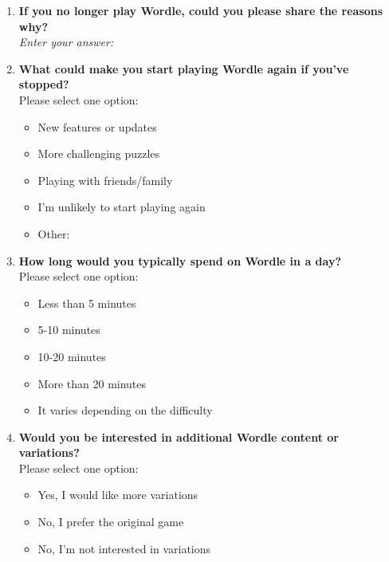 \begin{enumerate}
    \item \textbf{If you no longer play Wordle, could you please share the reasons why?} \\
    \textit{Enter your answer:} \underline{\hspace{10cm}}

    \item \textbf{What could make you start playing Wordle again if you've stopped?} \\
    Please select one option:
    \begin{itemize}
        \item New features or updates
        \item More challenging puzzles
        \item Playing with friends/family
        \item I’m unlikely to start playing again
        \item Other: \underline{\hspace{5cm}}
    \end{itemize}

    \item \textbf{How long would you typically spend on Wordle in a day?} \\
    Please select one option:
    \begin{itemize}
        \item Less than 5 minutes
        \item 5-10 minutes
        \item 10-20 minutes
        \item More than 20 minutes
        \item It varies depending on the difficulty
    \end{itemize}

    \item \textbf{Would you be interested in additional Wordle content or variations?} \\
    Please select one option:
    \begin{itemize}
        \item Yes, I would like more variations
        \item No, I prefer the original game
        \item No, I’m not interested in variations
    \end{itemize}


\end{enumerate}
